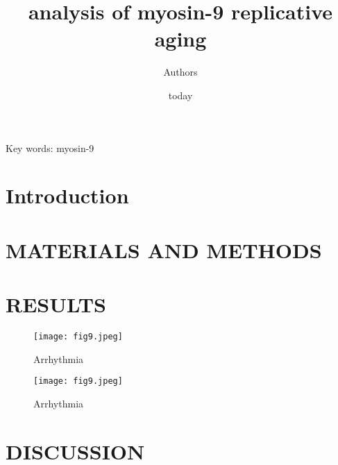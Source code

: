 \documentclass[a4paper,12pt]{article}
\title{ analysis of myosin-9 replicative aging}
\author{Authors}
\date{today}
\begin{document}
\maketitle

Key words: myosin-9

\section{Introduction}

\section{MATERIALS AND METHODS}

\section{RESULTS}


\begin{figure}
    \texttt{[image: fig9.jpeg]}
    \caption{Arrhythmia}
    \label{fig:fig9}
\end{figure}

\begin{figure}
    \texttt{[image: fig9.jpeg]}
    \caption{Arrhythmia}
    \label{fig:fig8}
\end{figure}

\section{DISCUSSION}



\end{document}
